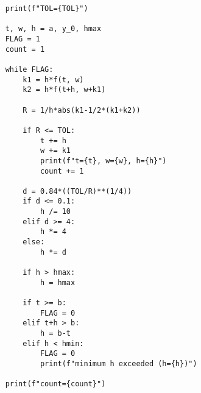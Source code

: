 \documentclass{article}
\begin{document}
\begin{itemize}
\begin{verbatim}
    print(f"TOL={TOL}")

    t, w, h = a, y_0, hmax
    FLAG = 1
    count = 1

    while FLAG:
        k1 = h*f(t, w)
        k2 = h*f(t+h, w+k1)

        R = 1/h*abs(k1-1/2*(k1+k2))

        if R <= TOL:
            t += h
            w += k1
            print(f"t={t}, w={w}, h={h}")
            count += 1

        d = 0.84*((TOL/R)**(1/4))
        if d <= 0.1:
            h /= 10
        elif d >= 4:
            h *= 4
        else:
            h *= d

        if h > hmax:
            h = hmax

        if t >= b:
            FLAG = 0
        elif t+h > b:
            h = b-t
        elif h < hmin:
            FLAG = 0
            print(f"minimum h exceeded (h={h})")

    print(f"count={count}")
    \end{verbatim}
\end{itemize}
\end{document}

